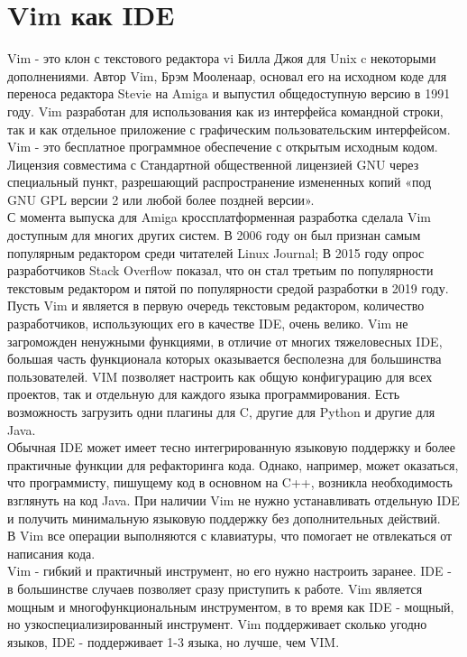 \section{Vim как IDE}
Vim - это клон с текстового редактора vi Билла Джоя для Unix c некоторыми дополнениями. Автор Vim, 
Брэм Мооленаар, основал его на исходном коде для переноса редактора Stevie на Amiga и выпустил
общедоступную версию в 1991 году. Vim разработан для использования как из интерфейса командной 
строки, так и как отдельное приложение с графическим пользовательским интерфейсом. Vim - это 
бесплатное программное обеспечение с открытым исходным кодом. Лицензия совместима с Стандартной
общественной лицензией GNU через специальный пункт, разрешающий распространение измененных копий 
«под GNU GPL версии 2 или любой более поздней версии».\\

С момента выпуска для Amiga кроссплатформенная разработка сделала Vim доступным для многих других 
систем. В 2006 году он был признан самым популярным редактором среди читателей Linux Journal; В 
2015 году опрос разработчиков Stack Overflow показал, что он стал третьим по популярности текстовым
редактором и пятой по популярности средой разработки в 2019 году.\\

Пусть Vim и является в первую очередь текстовым редактором, количество разработчиков, использующих 
его в качестве IDE, очень велико. Vim не загроможден ненужными функциями, в отличие от многих 
тяжеловесных IDE, большая часть функционала которых оказывается бесполезна для большинства 
пользователей. VIM позволяет настроить как общую конфигурацию для всех проектов, так и отдельную 
для каждого языка программирования. Есть возможность загрузить одни плагины для C, другие для Python 
и другие для Java.\\

Обычная IDE может имеет тесно интегрированную языковую поддержку и более практичные функции для рефакторинга кода. Однако, например, может оказаться, что программисту, пишущему код в основном на 
C++, возникла необходимость взглянуть на код Java. При наличии Vim не нужно устанавливать отдельную IDE и получить минимальную языковую поддержку без дополнительных действий. \\

В Vim все операции выполняются с клавиатуры, что помогает не отвлекаться от написания кода.\\ 

Vim - гибкий и практичный инструмент, но его нужно настроить заранее. IDE - в большинстве случаев
позволяет сразу приступить к работе. Vim является мощным и многофункциональным инструментом, в то 
время как IDE - мощный, но узкоспециализированный инструмент. Vim поддерживает сколько угодно языков, 
IDE - поддерживает 1-3 языка, но лучше, чем VIM.\\

